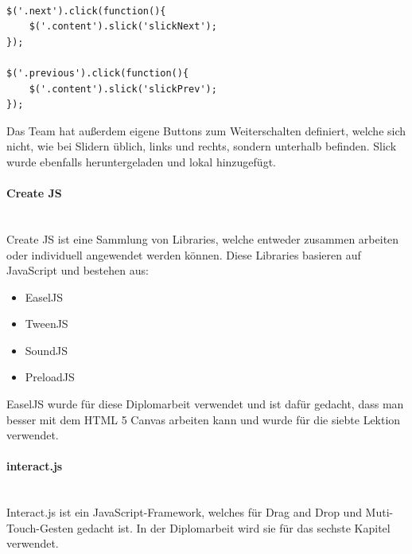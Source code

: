 \lstset{
  frame=leftline,
  xleftmargin=.05\textwidth
}
\begin{lstlisting}

$('.next').click(function(){
	$('.content').slick('slickNext');
});

$('.previous').click(function(){
	$('.content').slick('slickPrev');
});
\end{lstlisting} \leavevmode \newline
Das Team hat außerdem eigene Buttons zum Weiterschalten definiert, welche sich nicht, wie bei Slidern üblich, links und rechts, sondern unterhalb befinden. Slick wurde ebenfalls heruntergeladen und lokal hinzugefügt.
\paragraph{Create JS} \leavevmode \\
Create JS ist eine Sammlung von Libraries, welche entweder zusammen arbeiten oder individuell angewendet werden können. Diese Libraries basieren auf JavaScript und bestehen aus:
\begin{itemize}
\item EaselJS
\item TweenJS
\item SoundJS
\item PreloadJS
\end{itemize}
EaselJS wurde für diese Diplomarbeit verwendet und ist dafür gedacht, dass man besser mit dem HTML 5 Canvas arbeiten kann und wurde für die siebte Lektion verwendet. \cite{createjs}
\paragraph{interact.js} \leavevmode \\
Interact.js ist ein JavaScript-Framework, welches für Drag and Drop und Muti-Touch-Gesten gedacht ist. In der Diplomarbeit wird sie für das sechste Kapitel verwendet. \cite{interact}
